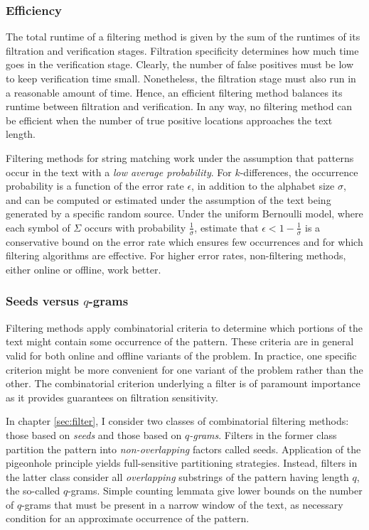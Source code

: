 \subsubsection{Efficiency}

The total runtime of a filtering method is given by the sum of the runtimes of its filtration and verification stages.
Filtration specificity determines how much time goes in the verification stage.
Clearly, the number of false positives must be low to keep verification time small.
Nonetheless, the filtration stage must also run in a reasonable amount of time.
Hence, an efficient filtering method balances its runtime between filtration and verification.
In any way, no filtering method can be efficient when the number of true positive locations approaches the text length.

Filtering methods for string matching work under the assumption that patterns occur in the text with a \emph{low average probability}.
For $k$-differences, the occurrence probability is a function of the error rate $\epsilon$, in addition to the alphabet size $\sigma$, and can be computed or estimated under the assumption of the text being generated by a specific random source.
Under the uniform Bernoulli model, where each symbol of $\Sigma$ occurs with probability $\frac{1}{\sigma}$, \citeauthor{Navarro2000} estimate that $\epsilon < 1 - \frac{1}{\sigma}$ is a conservative bound on the error rate which ensures few occurrences and for which filtering algorithms are effective.
For higher error rates, non-filtering methods, either online or offline, work better.

\subsubsection{Seeds versus $q$-grams}

Filtering methods apply combinatorial criteria to determine which portions of the text might contain some occurrence of the pattern.
These criteria are in general valid for both online and offline variants of the problem.
In practice, one specific criterion might be more convenient for one variant of the problem rather than the other.
The combinatorial criterion underlying a filter is of paramount importance as it provides guarantees on filtration sensitivity.

In chapter \ref{sec:filter}, I consider two classes of combinatorial filtering methods: those based on \emph{seeds} and those based on \emph{$q$-grams}.
Filters in the former class partition the pattern into \emph{non-overlapping} factors called seeds.
Application of the pigeonhole principle yields full-sensitive partitioning strategies.
Instead, filters in the latter class consider all \emph{overlapping} substrings of the pattern having length $q$, the so-called $q$-grams.
Simple counting lemmata give lower bounds on the number of $q$-grams that must be present in a narrow window of the text, as necessary condition for an approximate occurrence of the pattern.
